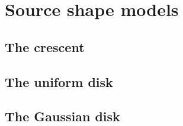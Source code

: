 \section{Source shape models}

\subsection{The crescent}
\subsection{The uniform disk}
\subsection{The Gaussian disk}